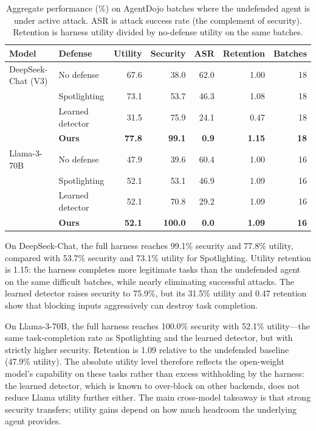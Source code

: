 \begin{table}[t]
\centering
\small
\setlength{\tabcolsep}{7pt}
\caption{Aggregate performance (\%) on AgentDojo batches where the undefended agent is under active attack. ASR is attack success rate (the complement of security). Retention is harness utility divided by no-defense utility on the same batches.}
\label{tab:main-results}
\begin{tabular}{llrrrrr}
\toprule
Model & Defense & Utility & Security & ASR & Retention & Batches \\
\midrule
DeepSeek-Chat (V3) & No defense & 67.6 & 38.0 & 62.0 & 1.00 & 18 \\
 & Spotlighting & 73.1 & 53.7 & 46.3 & 1.08 & 18 \\
 & Learned detector & 31.5 & 75.9 & 24.1 & 0.47 & 18 \\
 & \textbf{Ours} & \textbf{77.8} & \textbf{99.1} & \textbf{0.9} & \textbf{1.15} & \textbf{18} \\
\midrule
Llama-3-70B & No defense & 47.9 & 39.6 & 60.4 & 1.00 & 16 \\
 & Spotlighting & 52.1 & 53.1 & 46.9 & 1.09 & 16 \\
 & Learned detector & 52.1 & 70.8 & 29.2 & 1.09 & 16 \\
 & \textbf{Ours} & \textbf{52.1} & \textbf{100.0} & \textbf{0.0} & \textbf{1.09} & \textbf{16} \\
\bottomrule
\end{tabular}
\end{table}

On DeepSeek-Chat, the full harness reaches 99.1\% security and 77.8\% utility, compared with 53.7\% security and 73.1\% utility for Spotlighting. Utility retention is 1.15: the harness completes more legitimate tasks than the undefended agent on the same difficult batches, while nearly eliminating successful attacks. The learned detector raises security to 75.9\%, but its 31.5\% utility and 0.47 retention show that blocking inputs aggressively can destroy task completion.

On Llama-3-70B, the full harness reaches 100.0\% security with 52.1\% utility---the same task-completion rate as Spotlighting and the learned detector, but with strictly higher security. Retention is 1.09 relative to the undefended baseline (47.9\% utility). The absolute utility level therefore reflects the open-weight model's capability on these tasks rather than excess withholding by the harness: the learned detector, which is known to over-block on other backends, does not reduce Llama utility further either. The main cross-model takeaway is that strong security transfers; utility gains depend on how much headroom the underlying agent provides.

